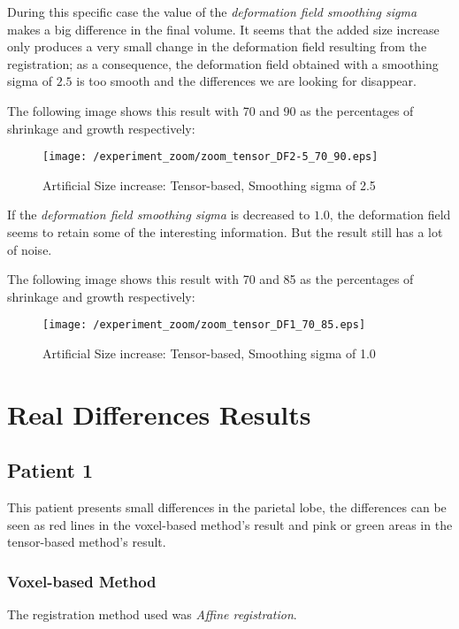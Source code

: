 During this specific case the value of the \textit{deformation field
  smoothing sigma} makes a big difference in the final volume.  It
seems that the added size increase only produces a very small change
in the deformation field resulting from the registration; as a
consequence, the deformation field obtained with a smoothing sigma of
$2.5$ is too smooth and the differences we are looking for disappear.

The following image shows this result with 70 and 90 as the
percentages of shrinkage and growth respectively:

\begin{figure}[H]
  \centering
  \texttt{[image: /experiment\_zoom/zoom\_tensor\_DF2-5\_70\_90.eps]}
  \caption{Artificial Size increase: Tensor-based, Smoothing sigma of 2.5}
  \label{zoom_tensor1}
\end{figure}

If the \textit{deformation field smoothing sigma} is decreased to
$1.0$, the deformation field seems to retain some of the interesting
information. But the result still has a lot of noise.

The following image shows this result with 70 and 85 as the
percentages of shrinkage and growth respectively:

\begin{figure}[H]
  \centering
  \texttt{[image: /experiment\_zoom/zoom\_tensor\_DF1\_70\_85.eps]}
  \caption{Artificial Size increase: Tensor-based, Smoothing sigma of 1.0}
  \label{zoom_tensor2}
\end{figure}


\section{Real Differences Results}

\subsection{Patient 1}
This patient presents small differences in the parietal lobe, the
differences can be seen as red lines in the voxel-based method's result
and pink or green areas in the tensor-based method's result.

\subsubsection{Voxel-based Method}
The registration method used was \textit{Affine registration}.

